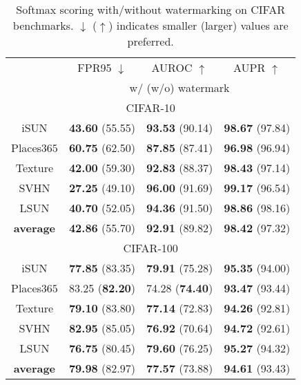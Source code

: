 \documentclass{article}
\begin{document}
\begin{table}[t]
\parbox{.47\linewidth}{
\centering
\caption{Softmax scoring with/without watermarking on CIFAR benchmarks. $\downarrow$ ($\uparrow$) indicates smaller (larger) values are preferred.} \label{tab: softmax}
\vspace{5pt}
\scriptsize
{
\begin{tabular}{c|ccc}
\toprule[1.5pt]
                   & FPR95 $\downarrow$     & AUROC $\uparrow$       & AUPR $\uparrow$      \\
                   \cline{2-4} 
\multirow{-2}{*}{} & \multicolumn{3}{c}{w/ (w/o) watermark} \\
\midrule[0.6pt]
\multicolumn{4}{c}{\cellcolor{greyL}CIFAR-10} \\
\midrule[0.6pt]
iSUN               & \textbf{43.60} (55.55) & \textbf{93.53} (90.14) & \textbf{98.67} (97.84) \\ 
Places$365$          & \textbf{60.75} (62.50) & \textbf{87.85} (87.41) & \textbf{96.98} (96.94) \\
Texture            & \textbf{42.00} (59.30) & \textbf{92.83} (88.37) & \textbf{98.43} (97.14) \\
SVHN               & \textbf{27.25} (49.10) & \textbf{96.00} (91.69) & \textbf{99.17} (96.54) \\
LSUN             & \textbf{40.70} (52.05) & \textbf{94.36} (91.50) & \textbf{98.86} (98.16) \\
\midrule
\textbf{average}   & \textbf{42.86} (55.70) & \textbf{92.91} (89.82) & \textbf{98.42} (97.32) \\ \midrule[1pt]
\multicolumn{4}{c}{\cellcolor{greyL}CIFAR-100} \\
\midrule[1pt]
iSUN               & \textbf{77.85} (83.35) & \textbf{79.91} (75.28) & \textbf{95.35} (94.00) \\ 
Places$365$          & 83.25 (\textbf{82.20}) & 74.28 (\textbf{74.40}) & \textbf{93.47} (93.44) \\
Texture            & \textbf{79.10} (83.80) & \textbf{77.14} (72.83) & \textbf{94.26} (92.81) \\
SVHN               & \textbf{82.95} (85.05) & \textbf{76.92} (70.64) & \textbf{94.72} (92.61) \\
LSUN             & \textbf{76.75} (80.45) & \textbf{79.60} (76.25) & \textbf{95.27} (94.32) \\
\midrule
\textbf{average}   & \textbf{79.98} (82.97) & \textbf{77.57} (73.88) & \textbf{94.61} (93.43) \\ \bottomrule[1.5pt]      

\end{tabular}}}
\end{table}
\end{document}
